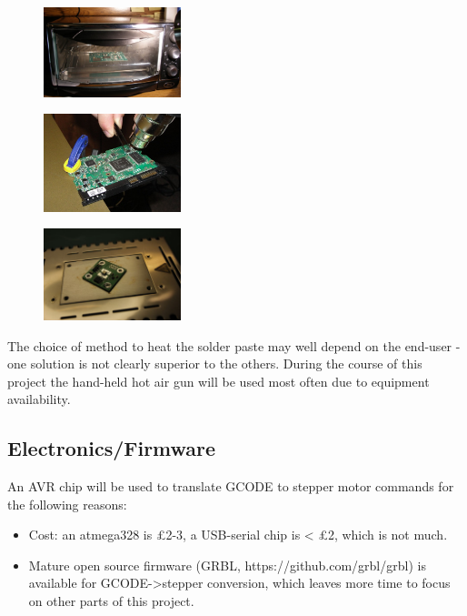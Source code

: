 \begin{figure}
\centering
\begin{minipage}{.3\textwidth}
	\centering
	\includegraphics[width=40mm]{resources/boardintheoven.jpg}
	\label{toasteroven}
\end{minipage}%
\hfill
\begin{minipage}{.3\textwidth}
	\centering
	\includegraphics[width=40mm]{resources/hotair_demo.jpg}
	\label{hotairdemo}
\end{minipage}%
\hfill
\begin{minipage}{.3\textwidth}
	\centering
	\includegraphics[width=40mm]{resources/hotplate.jpg}
	\label{hotplate}
\end{minipage}
\end{figure}	
			
The choice of method to heat the solder paste may well depend on the end-user - one solution is not clearly superior to the others. During the
course of this project the hand-held hot air gun will be used most often due to equipment availability.

\subsection{Electronics/Firmware}
An AVR chip will be used to translate GCODE to stepper motor commands for the following reasons:

\begin{itemize} \itemsep0em
	\item	Cost: an atmega328 is \pounds 2-3, a USB-serial chip is < \pounds 2, which is not much.
	\item	Mature open source firmware (GRBL, https://github.com/grbl/grbl) is available for GCODE-\textgreater stepper
		conversion, which leaves more time to focus on other parts of this project.
\end{itemize}

